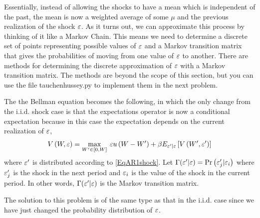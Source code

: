 Essentially, instead of allowing the shocks to have a mean which is independent of the past, the mean is now a weighted average of some $\mu$ and the previous realization of the shock $\varepsilon$.  As it turns out, we can approximate this process by thinking of it like a Markov Chain. This means we need to determine a discrete set of points representing possible values of $\varepsilon$ and a Markov transition matrix that gives the probabilities of moving from one value of $\varepsilon$ to another.  There are methods for determining the discrete approximation of $\varepsilon$ with a Markov transition matrix.  The methods are beyond the scope of this section, but you can use the file tauchenhussey.py to implement them in the next problem.

The the Bellman equation becomes the following, in which the only change from the i.i.d. shock case is that the expectations operator is now a conditional expectation because in this case the expectation depends on the current realization of $\varepsilon$,
\begin{equation*}
   V\left(W,\varepsilon\right) = \max_{W'\in[0,W]}\: \varepsilon u\left(W - W'\right) + \beta E_{\varepsilon'|\varepsilon}\left[V\left(W',\varepsilon'\right)\right]
\end{equation*}
where $\varepsilon'$ is distributed according to \eqref{EqAR1shock}. Let $\Gamma(\varepsilon'|\varepsilon)=\text{Pr}\left(\varepsilon_j'|\varepsilon_i\right)$ where $\varepsilon_j'$ is the shock in the next period and $\varepsilon_i$ is the value of the shock in the current period.  In other words, $\Gamma(\varepsilon' | \varepsilon)$ is the Markov transition matrix.

The solution to this problem is of the same type as that in the i.i.d. case since we have just changed the probability distribution of $\varepsilon$.


